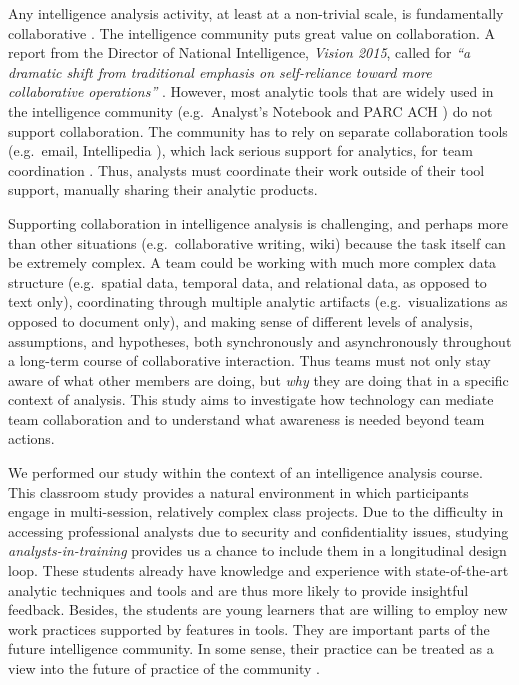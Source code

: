 Any intelligence analysis activity, at least at a non-trivial scale, is
fundamentally collaborative \cite{Convertino2011}. The intelligence community
puts great value on collaboration. A report from the Director of National
Intelligence, \emph{Vision 2015},  called for \emph{``a dramatic shift from
traditional emphasis on self-reliance toward more collaborative operations''}
\cite[p.13]{Vision2015}. However, most analytic tools that are widely used in
the intelligence community (e.g.~Analyst's Notebook \cite{IBM} and PARC ACH
\cite{PARC}) do not support collaboration. The community has to rely on separate
collaboration tools (e.g.~email, Intellipedia \cite{Intelink2017}), which lack
serious support for analytics, for team coordination \cite{Treverton2016}. Thus,
analysts must coordinate their work outside of their tool support, manually
sharing their analytic products.

Supporting collaboration in intelligence analysis is challenging, and perhaps
more than other situations (e.g.~collaborative writing, wiki) because the task
itself can be extremely complex. A team could be working with much more complex
data structure (e.g.~spatial data, temporal data, and relational data, as
opposed to text only), coordinating through multiple analytic artifacts
(e.g.~visualizations as opposed to document only), and making
sense of different levels of analysis, assumptions, and hypotheses, both
synchronously and asynchronously throughout a long-term course of collaborative
interaction. Thus teams must not only stay aware of what other members are doing, but \emph{why} they are doing that in a specific context of analysis. This study aims to investigate how technology can mediate team collaboration and to understand what awareness is needed beyond team actions.

We performed our study within the context of an intelligence analysis course.
This classroom study provides a natural environment in which participants engage
in multi-session, relatively complex class projects. Due to the difficulty in
accessing professional analysts due to security and confidentiality issues,
studying \emph{analysts-in-training} provides us a chance to include them in a
longitudinal design loop. These students already have knowledge and experience
with state-of-the-art analytic techniques and tools and are thus more likely to
provide insightful feedback. Besides, the students are young learners that are
willing to employ new work practices supported by features in tools. They are
important parts of the future intelligence community. In some sense, their
practice can be treated as a view into the future of practice of the community
\cite{Martin2014}.

